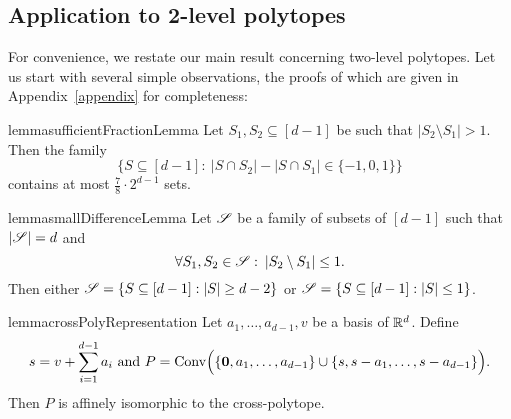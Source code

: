 \subsection{Application to \textbf{2}-level polytopes} \label{sec2level}
For convenience, we restate our main result concerning two-level polytopes.
\twoLevelNew*
\noindent Let us start with several simple observations, the proofs of which are given in Appendix~\ref{appendix} for completeness:
\begin{restatable}[]{lemma}{sufficientFractionLemma}\label{78sufficientLemma}
    Let $S_1, S_2 \subseteq [d-1]$ be such that $|S_2 \setminus S_1| > 1$. Then the family 
    \[
        \bigl\{S \subseteq [d-1]:\: |S\cap S_2|-|S\cap S_1| \in \{-1, 0, 1\}\bigr\}
    \]
    contains at most $\frac{7}{8}\cdot 2^{d-1}$ sets. 
\end{restatable}

\begin{restatable}[]{lemma}{smallDifferenceLemma}\label{smallDifferenceLemma}
    Let ${\mathscr{S}}$ be a family of subsets of $[d-1]$ such that $|{\mathscr{S}}| = d$ and 
    \[
        \forall S_1, S_2 \in {\mathscr{S}}:\:|S_2\setminus S_1|\leq 1.
    \]
    Then either ${\mathscr{S}} = \{S\subseteq[d-1]: |S| \geq d-2\}$ or ${\mathscr{S}} = \{S\subseteq[d-1]: |S| \leq 1\}$.
\end{restatable}

\begin{restatable}[]{lemma}{crossPolyRepresentation}\label{crossPolyRepr}
    Let ${a_1, \ldots, a_{d-1}, v}$ be a basis of ${\mathbb{R}}^d$. Define
    \[
        s=v+\sum_{i=1}^{d-1}a_i\text{ and }P=\operatorname{Conv}\Bigl(\{\mathbf{0}, a_1, \ldots, a_{d-1}\}\cup\{s, s-a_1, \ldots, s-a_{d-1}\}\Bigr).
    \]
    Then $P$ is affinely isomorphic to the cross-polytope.
\end{restatable}

